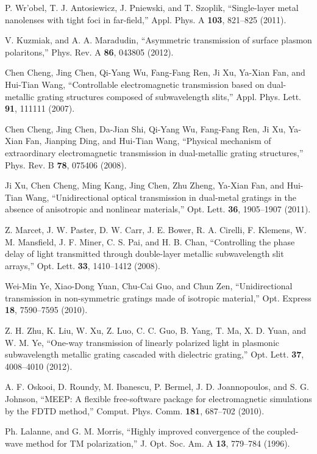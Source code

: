 \documentclass[10pt,letterpaper,twocolumn]{article} %
\begin{document}
\begin{thebibliography}{10}
P. Wr\a'{o}bel, T. J. Antosiewicz, J. Pniewski, and T. Szoplik,
``Single-layer metal nanolenses with tight foci in far-field,'' 
Appl. Phys. A \textbf{103}, 821--825 (2011).

V. Kuzmiak, and A. A. Maradudin, 
``Asymmetric transmission of surface plasmon polaritons,'' 
Phys. Rev. A \textbf{86}, 043805 (2012).

Chen Cheng, Jing Chen, Qi-Yang Wu, Fang-Fang Ren, Ji Xu, Ya-Xian Fan, and Hui-Tian Wang,
``Controllable electromagnetic transmission based on dual-metallic grating structures composed of subwavelength slits,''  
Appl. Phys. Lett. \textbf{91}, 111111 (2007).

Chen Cheng, Jing Chen, Da-Jian Shi, Qi-Yang Wu, Fang-Fang Ren, Ji Xu, Ya-Xian Fan, Jianping Ding, and Hui-Tian Wang,
``Physical mechanism of extraordinary electromagnetic transmission in dual-metallic grating structures,''
Phys. Rev. B \textbf{78}, 075406 (2008).


Ji Xu, Chen Cheng, Ming Kang, Jing Chen, Zhu Zheng, Ya-Xian Fan, and Hui-Tian Wang, 
``Unidirectional optical transmission in dual-metal gratings in the absence of anisotropic and nonlinear materials,''
Opt. Lett. \textbf{36}, 1905--1907 (2011). 

Z. Marcet, J. W. Paster, D. W. Carr, J. E. Bower, R. A. Cirelli, F. Klemens, W. M. Mansfield, J. F. Miner, C. S. Pai, and H. B. Chan, 
``Controlling the phase delay of light transmitted through double-layer metallic subwavelength slit arrays,''
Opt. Lett. \textbf{33}, 1410--1412 (2008). %

Wei-Min Ye, Xiao-Dong Yuan, Chu-Cai Guo, and Chun Zen, 
``Unidirectional transmission in non-symmetric gratings made of isotropic material,'' 
Opt. Express \textbf{18}, 7590--7595 (2010).  



Z. H. Zhu, K. Liu, W. Xu, Z. Luo, C. C. Guo, B. Yang, T. Ma, X. D. Yuan, and W. M. Ye, 
``One-way transmission of linearly polarized light in plasmonic subwavelength metallic grating cascaded with dielectric grating,''
Opt. Lett. \textbf{37}, 4008--4010 (2012).


A. F. Oskooi, D. Roundy, M. Ibanescu, P. Bermel, J. D. Joannopoulos, and S. G. Johnson, 
``MEEP: A flexible free-software package for electromagnetic simulations by the FDTD method,''
Comput. Phys. Comm. \textbf{181}, 687--702 (2010).

Ph. Lalanne, and G. M. Morris,
``Highly improved convergence of the coupled-wave method for TM polarization,''
J. Opt. Soc. Am. A \textbf{13}, 779--784  (1996). 

\end{thebibliography}
\end{document}
